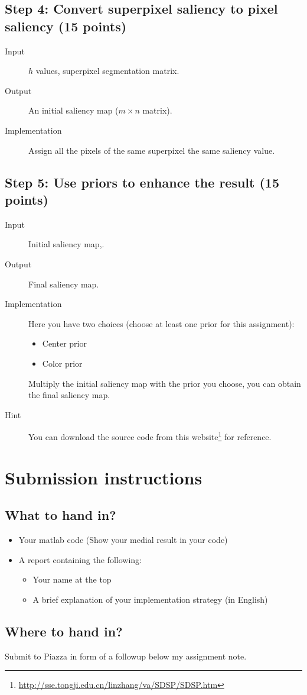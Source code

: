 \documentclass[12pt]{article}
\begin{document}
\subsection{Step 4: Convert superpixel saliency to pixel saliency (15 points)}

\begin{description}
\item[Input] $h$ values, superpixel segmentation matrix.
\item[Output] An initial saliency map ($m \times n$ matrix).
\item[Implementation] Assign all the pixels of the same superpixel the same saliency value. 
\end{description}

\subsection{Step 5: Use priors to enhance the result (15 points)}

\begin{description}
\item[Input] Initial saliency map,.
\item[Output] Final saliency map.
\item[Implementation] Here you have two choices (choose at least one prior for this assignment):
\begin{itemize}
\item Center prior
\item Color prior
\end{itemize}
Multiply the initial saliency map with the prior you choose, you can obtain the final saliency map.
\item[Hint] You can download the source code from this website\footnote{\url{http://sse.tongji.edu.cn/linzhang/va/SDSP/SDSP.htm}} for reference.
\end{description}

\section{Submission instructions}

\subsection{What to hand in?}

\begin{itemize}
\item Your matlab code (Show your medial result in your code)
\item A report containing the following:
\begin{itemize}
\item Your name at the top
\item A brief explanation of your implementation strategy (in English)
\end{itemize}
\end{itemize}

\subsection{Where to hand in?}

Submit to Piazza in form of a followup below my assignment note.





%
%
% 

\end{document}
